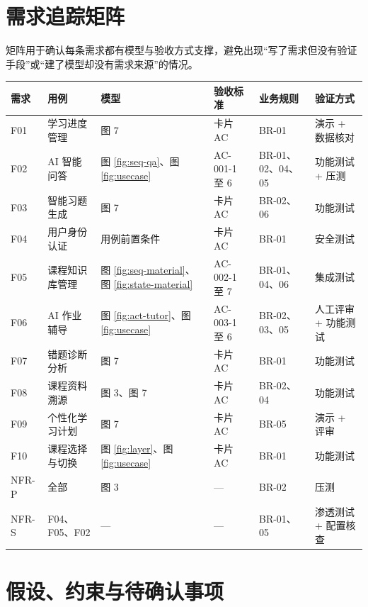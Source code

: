 \documentclass[12pt,a4paper]{ctexart}
\begin{document}
\section{需求追踪矩阵}

矩阵用于确认每条需求都有模型与验收方式支撑，避免出现“写了需求但没有验证手段”或“建了模型却没有需求来源”的情况。

\begin{longtable}{@{}C{1.4cm}L{3.2cm}L{2.3cm}L{2.6cm}L{2.8cm}L{2.2cm}@{}}
  \toprule
  \textbf{需求} & \textbf{用例} & \textbf{模型} & \textbf{验收标准} & \textbf{业务规则} & \textbf{验证方式} \\
  \midrule
  \endhead
  F01 & 学习进度管理 & 图 7 & 卡片 AC & BR-01 & 演示 + 数据核对 \\
  F02 & AI 智能问答 & 图 \ref{fig:seq-qa}、图 \ref{fig:usecase} & AC-001-1 至 6 & BR-01、02、04、05 & 功能测试 + 压测 \\
  F03 & 智能习题生成 & 图 7 & 卡片 AC & BR-02、06 & 功能测试 \\
  F04 & 用户身份认证 & 用例前置条件 & 卡片 AC & BR-01 & 安全测试 \\
  F05 & 课程知识库管理 & 图 \ref{fig:seq-material}、图 \ref{fig:state-material} & AC-002-1 至 7 & BR-01、04、06 & 集成测试 \\
  F06 & AI 作业辅导 & 图 \ref{fig:act-tutor}、图 \ref{fig:usecase} & AC-003-1 至 6 & BR-02、03、05 & 人工评审 + 功能测试 \\
  F07 & 错题诊断分析 & 图 7 & 卡片 AC & BR-01 & 功能测试 \\
  F08 & 课程资料溯源 & 图 3、图 7 & 卡片 AC & BR-02、04 & 功能测试 \\
  F09 & 个性化学习计划 & 图 7 & 卡片 AC & BR-05 & 演示 + 评审 \\
  F10 & 课程选择与切换 & 图 \ref{fig:layer}、图 \ref{fig:usecase} & 卡片 AC & BR-01 & 功能测试 \\
  NFR-P & 全部 & 图 3 & — & BR-02 & 压测 \\
  NFR-S & F04、F05、F02 & — & — & BR-01、05 & 渗透测试 + 配置核查 \\
  \bottomrule
\end{longtable}

\section{假设、约束与待确认事项}
\end{document}
